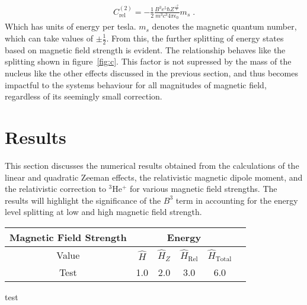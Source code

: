             \begin{align}
                C_{\text{rel}}^{(2)} = -\frac{1}{2} \frac{B^3 e^5 \hbar Z^{\frac{-7}{2}}}{m^3 c^3 4\pi \epsilon_0} m_s\;.
            \end{align}
            \noindent Which has units of energy per tesla. $m_s$ denotes the magnetic quantum number, which can take values of $\pm \frac{1}{2}$. From this, the further splitting of energy states based on magnetic field strength is evident. The relationship behaves like the splitting shown in figure~\ref{fig:c}. This factor is not supressed by the mass of the nucleus like the other effects discussed in the previous section, and thus becomes impactful to the systems behaviour for all magnitudes of magnetic field, regardless of its seemingly small correction.
    \section{Results}\label{sec:results}
        This section discusses the numerical results obtained from the calculations of the linear and quadratic Zeeman effects, the relativistic magnetic dipole moment, and the relativistic correction to $^3$He$^+$ for various magnetic field strengths. The results will highlight the significance of the $B^3$ term in accounting for the energy level splitting at low and high magnetic field strength.

        \begin{table}[h]
            \centering
            \renewcommand{\arraystretch}{1.5} %
            \begin{tabular}{|c|c|c|c|c|c|}
                \hline
                \multicolumn{1}{|c|}{Magnetic Field Strength} & \multicolumn{4}{c|}{Energy} \\ \hline
                Value & $\hat{H}$ & $\hat{H}_Z$ & $\hat{H}_{\text{Rel}}$ & $\hat{H}_{\text{Total}}$ \\ \hline
                Test & 1.0 & 2.0 & 3.0 & 6.0 \\ %
                \hline
            \end{tabular}
        \end{table}

        test \cite{Drake_1972}